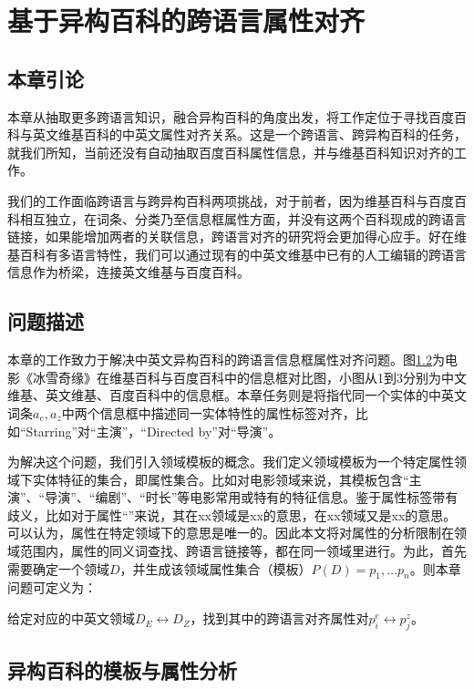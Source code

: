 \chapter{基于异构百科的跨语言属性对齐}
\label{cha:property-matching}

\section{本章引论}
本章从抽取更多跨语言知识，融合异构百科的角度出发，将工作定位于寻找百度百科与英文维基百科的中英文属性对齐关系。这是一个跨语言、跨异构百科的任务，就我们所知，当前还没有自动抽取百度百科属性信息，并与维基百科知识对齐的工作。

我们的工作面临跨语言与跨异构百科两项挑战，对于前者，因为维基百科与百度百科相互独立，在词条、分类乃至信息框属性方面，并没有这两个百科现成的跨语言链接，如果能增加两者的关联信息，跨语言对齐的研究将会更加得心应手。好在维基百科有多语言特性，我们可以通过现有的中英文维基中已有的人工编辑的跨语言信息作为桥梁，连接英文维基与百度百科。

\section{问题描述}
本章的工作致力于解决中英文异构百科的跨语言信息框属性对齐问题。图\ref{}为电影《冰雪奇缘》在维基百科与百度百科中的信息框对比图，小图从1到3分别为中文维基、英文维基、百度百科中的信息框。本章任务则是将指代同一个实体的中英文词条$a_e,a_z$中两个信息框中描述同一实体特性的属性标签对齐，比如“Starring”对“主演”，“Directed by”对“导演”。

为解决这个问题，我们引入{\heiti 领域模板}的概念。我们定义领域模板为一个特定属性领域下实体特征的集合，即属性集合。比如对电影领域来说，其模板包含“主演”、“导演”、“编剧”、“时长”等电影常用或特有的特征信息。鉴于属性标签带有歧义，比如对于属性“”来说，其在xx领域是xx的意思，在xx领域又是xx的意思。可以认为，属性在特定领域下的意思是唯一的。因此本文将对属性的分析限制在领域范围内，属性的同义词查找、跨语言链接等，都在同一领域里进行。为此，首先需要确定一个领域$D$，并生成该领域属性集合（模板）$P(D)={p_1,...p_n}$。则本章问题可定义为：

给定对应的中英文领域$D_E \leftrightarrow D_Z$，找到其中的跨语言对齐属性对$p_i^e \leftrightarrow p_j^z$。

\section{异构百科的模板与属性分析}
\label{sec:template-property-analysis}

